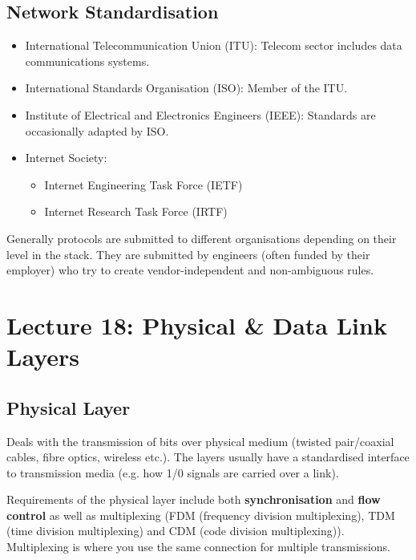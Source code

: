 \documentclass{article}%
\begin{document}
\subsection{Network Standardisation}
\label{sec:org4c1c95d}
\begin{itemize}
\item International Telecommunication Union (ITU): Telecom sector includes data communications systems.
\item International Standards Organisation (ISO): Member of the ITU.
\item Institute of Electrical and Electronics Engineers (IEEE): Standards are occasionally adapted by ISO.
\item Internet Society:
\begin{itemize}
\item Internet Engineering Task Force (IETF)
\item Internet Research Task Force (IRTF)
\end{itemize}
\end{itemize}
Generally protocols are submitted to different organisations depending on their level in the stack.
They are submitted by engineers (often funded by their employer) who try to create vendor-independent and non-ambiguous rules.

\maketitle
\section{Lecture 18: Physical \& Data Link Layers}


\subsection{Physical Layer}
\label{sec:org454d4f9}
Deals with the transmission of bits over physical medium (twisted pair/coaxial cables, fibre optics, wireless etc.).
The layers usually have a standardised interface to transmission media (e.g. how 1/0 signals are carried over a link).

Requirements of the physical layer include both \textbf{synchronisation} and \textbf{flow control} as well as multiplexing (FDM (frequency division multiplexing), TDM (time division multiplexing) and CDM (code division multiplexing)).
Multiplexing is where you use the same connection for multiple transmissions.
\end{document}
